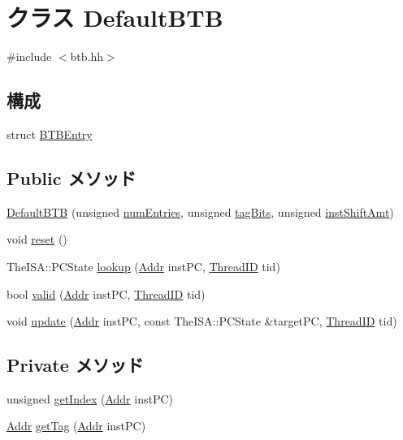 \hypertarget{classDefaultBTB}{
\section{クラス DefaultBTB}
\label{classDefaultBTB}
}


{\ttfamily \#include $<$btb.hh$>$}\subsection*{構成}
\begin{DoxyCompactItemize}
\item 
struct \hyperlink{structDefaultBTB_1_1BTBEntry}{BTBEntry}
\end{DoxyCompactItemize}
\subsection*{Public メソッド}
\begin{DoxyCompactItemize}
\item 
\hyperlink{classDefaultBTB_aa68341d7ac8d111892e8d8060e65000c}{DefaultBTB} (unsigned \hyperlink{classDefaultBTB_a325de474a9f6652329339d9fc2ea09c0}{numEntries}, unsigned \hyperlink{classDefaultBTB_a451757836c6c786aee898c2af4a278ae}{tagBits}, unsigned \hyperlink{classDefaultBTB_a8ad2ee60a6143561753205840ad144e7}{instShiftAmt})
\item 
void \hyperlink{classDefaultBTB_ad20897c5c8bd47f5d4005989bead0e55}{reset} ()
\item 
TheISA::PCState \hyperlink{classDefaultBTB_a9d526c907896ac36efb2c884420b0ae9}{lookup} (\hyperlink{base_2types_8hh_af1bb03d6a4ee096394a6749f0a169232}{Addr} instPC, \hyperlink{base_2types_8hh_ab39b1a4f9dad884694c7a74ed69e6a6b}{ThreadID} tid)
\item 
bool \hyperlink{classDefaultBTB_aadb1ec726de323616b1d961832dc48cd}{valid} (\hyperlink{base_2types_8hh_af1bb03d6a4ee096394a6749f0a169232}{Addr} instPC, \hyperlink{base_2types_8hh_ab39b1a4f9dad884694c7a74ed69e6a6b}{ThreadID} tid)
\item 
void \hyperlink{classDefaultBTB_a57a507feaef6242264a7fc6fa8e15bcd}{update} (\hyperlink{base_2types_8hh_af1bb03d6a4ee096394a6749f0a169232}{Addr} instPC, const TheISA::PCState \&targetPC, \hyperlink{base_2types_8hh_ab39b1a4f9dad884694c7a74ed69e6a6b}{ThreadID} tid)
\end{DoxyCompactItemize}
\subsection*{Private メソッド}
\begin{DoxyCompactItemize}
\item 
unsigned \hyperlink{classDefaultBTB_a8b650cb1fd2b3463eacf1966bafd2140}{getIndex} (\hyperlink{base_2types_8hh_af1bb03d6a4ee096394a6749f0a169232}{Addr} instPC)
\item 
\hyperlink{base_2types_8hh_af1bb03d6a4ee096394a6749f0a169232}{Addr} \hyperlink{classDefaultBTB_a16700c6e462c3dc0d378192ebd4818e1}{getTag} (\hyperlink{base_2types_8hh_af1bb03d6a4ee096394a6749f0a169232}{Addr} instPC)
\end{DoxyCompactItemize}
